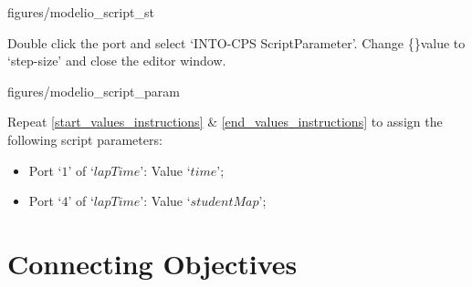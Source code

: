 \documentclass[11pt,a4paper]{../tutorial}
\begin{document}
\begin{instructions}
\begin{center}
\begin{annotation}[width=0.7\linewidth]{figures/modelio_script_st}
    \end{annotation}
\end{center}

\item \label{end_values_instructions}Double click the port and select `INTO-CPS \menusep ScriptParameter'. Change \{\}value to `step-size' and close the editor window.

\begin{center}
\begin{annotation}[width=0.7\linewidth]{figures/modelio_script_param}
    \end{annotation}
\end{center}

\item Repeat \ref{start_values_instructions} \& \ref{end_values_instructions} to assign the following script parameters:
\begin{itemize}
	\item Port `$1$' of `$lapTime$': Value `$time$';
	\item Port `$4$' of `$lapTime$': Value `$studentMap$';
\end{itemize}

\end{instructions}






\newpage
\section{Connecting Objectives}
\end{document}
